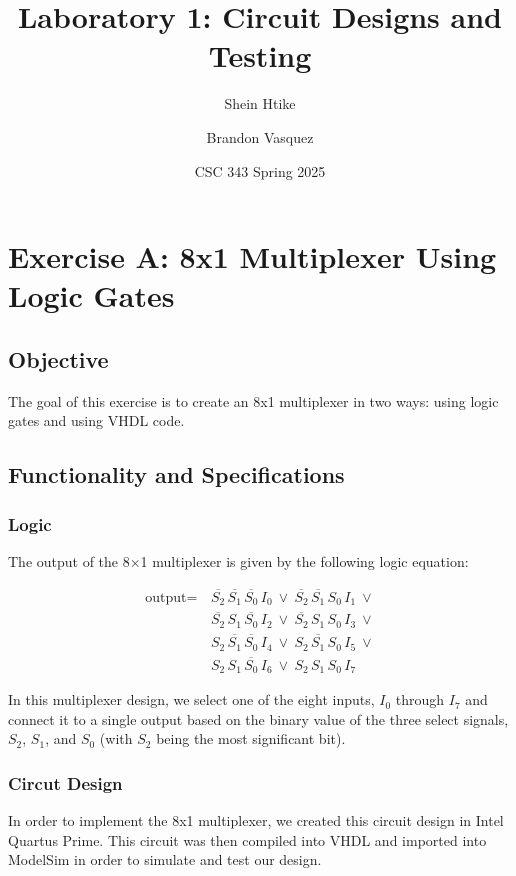 \documentclass[12pt]{article}
\begin{document}
\title{Laboratory 1: Circuit Designs and Testing}
\author{Shein Htike \and Brandon Vasquez}
\date{CSC 343 Spring 2025}
\maketitle

\tableofcontents
\clearpage

\section{Exercise A: 8x1 Multiplexer Using Logic Gates}
\subsection{Objective}
The goal of this exercise is to create an 8x1 multiplexer in two ways: using logic gates and using VHDL code.
\subsection{Functionality and Specifications}
\subsubsection{Logic}
The output of the 8×1 multiplexer is given by the following logic equation:

\begin{equation}
\begin{split}
\text{output} =\,& \overline{S_2}\,\overline{S_1}\,\overline{S_0}\,I_0 \ \vee\ \overline{S_2}\,\overline{S_1}\,S_0\,I_1 \ \vee \\[1mm]
                & \overline{S_2}\,S_1\,\overline{S_0}\,I_2 \ \vee\ \overline{S_2}\,S_1\,S_0\,I_3 \ \vee \\[1mm]
                & S_2\,\overline{S_1}\,\overline{S_0}\,I_4 \ \vee\ S_2\,\overline{S_1}\,S_0\,I_5 \ \vee \\[1mm]
                & S_2\,S_1\,\overline{S_0}\,I_6 \ \vee\ S_2\,S_1\,S_0\,I_7 
\end{split}
\end{equation}

In this multiplexer design, we select one of the eight inputs, $I_{0}$ through $I_{7}$ and connect it to a single output based on the binary value of the three select signals, $S_{2}$, $S_{1}$, and $S_{0}$ (with $S_{2}$ being the most significant bit).
\clearpage
\subsubsection{Circut Design}
In order to implement the 8x1 multiplexer, we created this circuit design in Intel Quartus Prime.
This circuit was then compiled into VHDL and imported into ModelSim in order to simulate and test our design. \\
\end{document}
